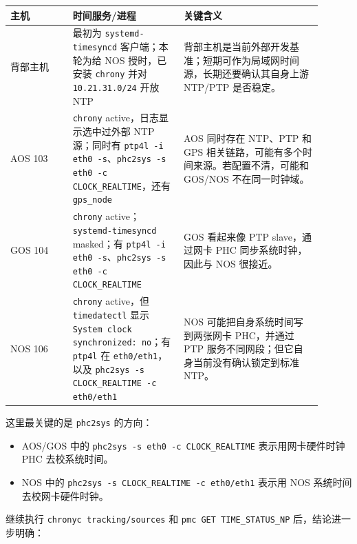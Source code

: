 \documentclass[UTF8,11pt,a4paper]{ctexart}
\begin{document}
\begin{center}
\renewcommand{\arraystretch}{1.18}
\begin{tabular}{p{0.18\linewidth}p{0.32\linewidth}p{0.40\linewidth}}
\toprule
\textbf{主机} & \textbf{时间服务/进程} & \textbf{关键含义}\\
\midrule
背部主机 &
最初为 \texttt{systemd-timesyncd} 客户端；本轮为给 NOS 授时，已安装 \texttt{chrony} 并对 \texttt{10.21.31.0/24} 开放 NTP &
背部主机是当前外部开发基准；短期可作为局域网时间源，长期还要确认其自身上游 NTP/PTP 是否稳定。\\
AOS 103 &
\texttt{chrony} active，日志显示选中过外部 NTP 源；同时有 \texttt{ptp4l -i eth0 -s}、\texttt{phc2sys -s eth0 -c CLOCK\_REALTIME}，还有 \texttt{gps\_node} &
AOS 同时存在 NTP、PTP 和 GPS 相关链路，可能有多个时间来源。若配置不清，可能和 GOS/NOS 不在同一时钟域。\\
GOS 104 &
\texttt{chrony} active；\texttt{systemd-timesyncd} masked；有 \texttt{ptp4l -i eth0 -s}、\texttt{phc2sys -s eth0 -c CLOCK\_REALTIME} &
GOS 看起来像 PTP slave，通过网卡 PHC 同步系统时钟，因此与 NOS 很接近。\\
NOS 106 &
\texttt{chrony} active，但 \texttt{timedatectl} 显示 \texttt{System clock synchronized: no}；有 \texttt{ptp4l} 在 \texttt{eth0/eth1}，以及 \texttt{phc2sys -s CLOCK\_REALTIME -c eth0/eth1} &
NOS 可能把自身系统时间写到两张网卡 PHC，并通过 PTP 服务不同网段；但它自身当前没有确认锁定到标准 NTP。\\
\bottomrule
\end{tabular}
\end{center}

这里最关键的是 \texttt{phc2sys} 的方向：

\begin{itemize}
  \item AOS/GOS 中的 \texttt{phc2sys -s eth0 -c CLOCK\_REALTIME} 表示用网卡硬件时钟 PHC 去校系统时间。
  \item NOS 中的 \texttt{phc2sys -s CLOCK\_REALTIME -c eth0/eth1} 表示用 NOS 系统时间去校网卡硬件时钟。
\end{itemize}

继续执行 \texttt{chronyc tracking/sources} 和 \texttt{pmc GET TIME\_STATUS\_NP} 后，结论进一步明确：
\end{document}
